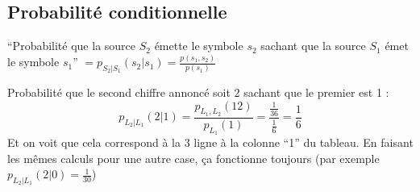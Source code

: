 \documentclass[11pt,a4paper]{article}
\begin{document}
\subsection{Probabilité conditionnelle}
\enquote{Probabilité que la source $S_2$ émette le symbole $s_2$ sachant que la source $S_1$ émet le symbole $s_1$} $ = p_{S_2|S_1}(s_2|s_1) = \frac{p(s_1,s_2)}{p(s_1)}$
\begin{exemple}
	Probabilité que le second chiffre annoncé soit 2 sachant que le premier est 1 : \[p_{L_2|L_1}(2|1) = \frac{p_{L_1,L_2}(12)}{p_{L_1}(1)} = \frac{\frac{1}{36}}{\frac{1}{6}} = \frac{1}{6}\]
	Et  on voit que cela correspond à la 3 ligne à la colonne \enquote{1} du tableau. En faisant les mêmes calculs pour une autre case, ça fonctionne toujours (par exemple $p_{L_2|L_1}(2|0) = \frac{1}{30}$)
\end{exemple}
\end{document}
